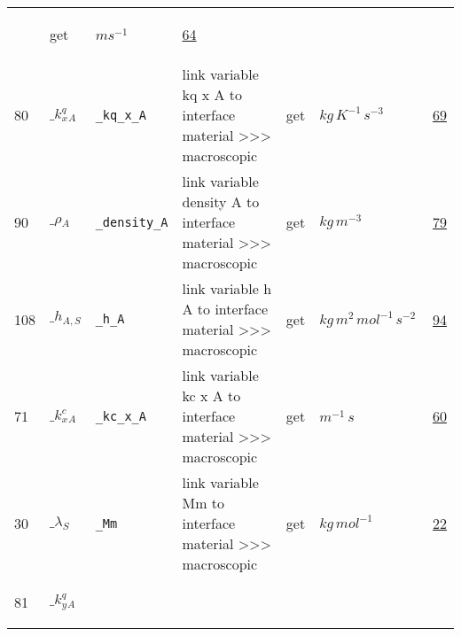 \begin{longtable}{|p{1cm}|p{2.5cm}|p{4.5cm}|p{8cm}|p{3.0cm}|p{3cm}|p{1cm}|}
             & \begin{lay}get \end{lay}
             & $ m s^{-1} \, $
             &                 \hyperlink{"e:64"}{ 64 }
                 \\
            80
             & \hypertarget{"v:80"}{ $ {{\_k^q_x}}{_{A}} $}
             & \verb|_kq_x_A|
             & link variable kq x A to interface material >>> macroscopic
             & \begin{lay}get \end{lay}
             & $ kg \,K^{-1} \,s^{-3} \, $
             &                 \hyperlink{"e:69"}{ 69 }
                 \\
            90
             & \hypertarget{"v:90"}{ $ {{\_\rho}}{_{A}} $}
             & \verb|_density_A|
             & link variable density A to interface material >>> macroscopic
             & \begin{lay}get \end{lay}
             & $ kg \,m^{-3} \, $
             &                 \hyperlink{"e:79"}{ 79 }
                 \\
            108
             & \hypertarget{"v:108"}{ $ {{\_h}}{_{A, S}} $}
             & \verb|_h_A|
             & link variable h A to interface material >>> macroscopic
             & \begin{lay}get \end{lay}
             & $ kg \,m^{2} \,mol^{-1} \,s^{-2} \, $
             &                 \hyperlink{"e:94"}{ 94 }
                 \\
            71
             & \hypertarget{"v:71"}{ $ {{\_k^c_x}}{_{A}} $}
             & \verb|_kc_x_A|
             & link variable kc x A to interface material >>> macroscopic
             & \begin{lay}get \end{lay}
             & $ m^{-1} \,s \, $
             &                 \hyperlink{"e:60"}{ 60 }
                 \\
            30
             & \hypertarget{"v:30"}{ $ {{\_\lambda}}{_{S}} $}
             & \verb|_Mm|
             & link variable Mm to interface material >>> macroscopic
             & \begin{lay}get \end{lay}
             & $ kg \,mol^{-1} \, $
             &                 \hyperlink{"e:22"}{ 22 }
                 \\
            81
             & \hypertarget{"v:81"}{ $ {{\_k^q_y}}{_{A}} $}

\end{longtable}
